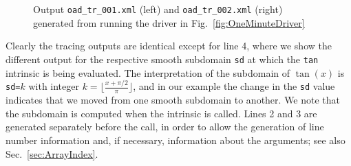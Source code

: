\documentclass{article}
\newcommand{\refsec}[1]{{Sec.~\ref{#1}}}
\newcommand{\reffig}[1]{{Fig.~\ref{#1}}}
\begin{document}
\begin{figure}
\begin{minipage}{.49\textwidth}

\end{minipage}
\hspace*{1ex}
\begin{minipage}{.46\textwidth}

\end{minipage}
\caption{Output \lstinline{oad_tr_001.xml} (left) 
and \lstinline{oad_tr_002.xml} (right) 
generated from running the driver in \reffig{fig:OneMinuteDriver}}\label{fig:OneMinuteXMLOutput}
\end{figure}
Clearly the tracing outputs are identical except for line 4, where we show the 
different output for the respective smooth subdomain \lstinline{sd} at which the 
\lstinline{tan} intrinsic is being evaluated. The interpretation of the subdomain of $\tan(x)$ 
is \lstinline{sd=}$k$ with integer $k=\lfloor\frac{x+\pi/2}{\pi}\rfloor$, and in our 
example the change in the \lstinline{sd} value  indicates that we moved from one smooth 
subdomain to another. 
We note that the subdomain is computed when the intrinsic is called. Lines 2 and 3 
are generated separately before the call, in order to allow the generation of line number information 
and, if necessary,  information about the arguments; see also \refsec{sec:ArrayIndex}.

\end{document}
